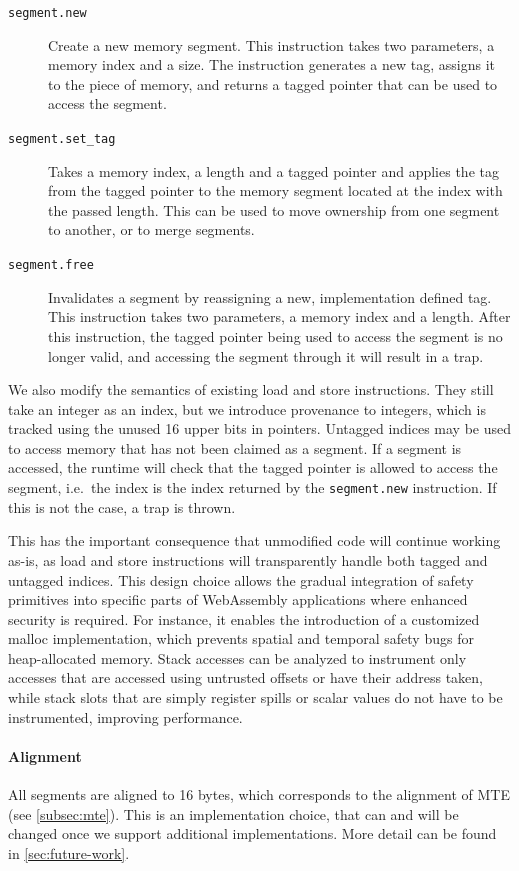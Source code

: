 \begin{description}
    \item[\texttt{segment.new}] Create a new memory segment.
    This instruction takes two parameters, a memory index and a size.
    The instruction generates a new tag, assigns it to the piece of memory, and returns a tagged pointer that can be used to access the segment.
    \item[\texttt{segment.set\_tag}] Takes a memory index, a length and a tagged pointer and applies the tag from the tagged pointer to the memory segment located at the index with the passed length.
    This can be used to move ownership from one segment to another, or to merge segments.
    \item[\texttt{segment.free}] Invalidates a segment by reassigning a new, implementation defined tag.
    This instruction takes two parameters, a memory index and a length.
    After this instruction, the tagged pointer being used to access the segment is no longer valid, and accessing the segment through it will result in a trap.
\end{description}

We also modify the semantics of existing load and store instructions.
They still take an integer as an index, but we introduce provenance to integers, which is tracked using the unused 16 upper bits in pointers.
Untagged indices may be used to access memory that has not been claimed as a segment.
If a segment is accessed, the runtime will check that the tagged pointer is allowed to access the segment, i.e.\ the index is the index returned by the \texttt{segment.new} instruction.
If this is not the case, a trap is thrown.

This has the important consequence that unmodified code will continue working as-is, as load and store instructions will transparently handle both tagged and untagged indices.
This design choice allows the gradual integration of safety primitives into specific parts of WebAssembly applications where enhanced security is required.
For instance, it enables the introduction of a customized malloc implementation, which prevents spatial and temporal safety bugs for heap-allocated memory.
Stack accesses can be analyzed to instrument only accesses that are accessed using untrusted offsets or have their address taken, while stack slots that are simply register spills or scalar values do not have to be instrumented, improving performance.

\paragraph{Alignment}
All segments are aligned to 16 bytes, which corresponds to the alignment of MTE (see \cref{subsec:mte}).
This is an implementation choice, that can and will be changed once we support additional implementations.
More detail can be found in \cref{sec:future-work}.


